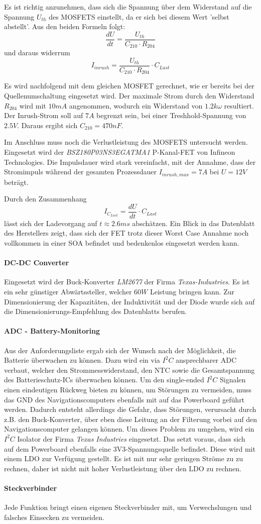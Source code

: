 \documentclass[main.tex]{subfiles} %
\begin{document}
Es ist richtig anzunehmen, dass sich die Spannung über dem Widerstand auf die
Spannung $U_{th}$ des MOSFETS einstellt, da er sich bei diesem Wert 'selbst
abstellt'. Aus den beiden Formeln folgt:
\[
    \frac{dU}{dt} = \frac{U_{th}}{C_{210} \cdot R_{204}}
\]
und daraus widerrum
\[
    I_{inrush} = \frac{U_{th}}{C_{210} \cdot R_{204}} \cdot C_{Last}
\]

Es wird nachfolgend mit dem gleichen MOSFET gerechnet, wie er bereits bei der
Quellenumschaltung eingesetzt wird. Der maximale Strom durch den Widerstand
$R_{204}$ wird mit $10mA$ angenommen, wodurch ein Widerstand von $1.2k \omega$
resultiert. Der Inrush-Strom soll auf $7A$ begrenzt sein, bei einer
Treshhold-Spannung von $2.5V$. Daraus ergibt sich $C_{210} = 470nF$.

Im Anschluss muss noch die Verlustleistung des MOSFETS untersucht werden.
Eingesetzt wird der \textit{BSZ180P03NS3EGATMA1} P-Kanal-FET von Infineon
Technologies. Die Impulsdauer wird stark vereinfacht, mit der Annahme, dass der
Stromimpuls während der gesamten Prozessdauer $I_{inrush, max} = 7A$ bei $U =
    12V$ beträgt.

Durch den Zusammenhang
\[
    I_{C_{Last}}  = \frac{dU}{dt} \cdot C_{Last}
\]
lässt sich der Ladevorgang auf $t \approx 2.6ms$ abschätzen. Ein Blick in das
Datenblatt des Herstellers zeigt, dass sich der FET trotz dieser Worst Case
Annahme noch vollkommen in einer SOA befindet und bedenkenlos eingesetzt werden
kann.

\paragraph{DC-DC Converter}
Eingesetzt wird der Buck-Konverter \textit{LM2677} der Firma
\textit{Texas-Industries}. Es ist ein sehr günstiger Abwärtssteller, welcher
$60W$ Leistung bringen kann. Zur Dimensionierung der Kapazitäten, der
Induktivität und der Diode wurde sich auf die Dimensionierungs-Empfehlung des
Datenblatts berufen.

\paragraph{ADC - Battery-Monitoring}
Aus der Anforderungsliste ergab sich der Wunsch nach der Möglichkeit, die
Batterie überwachen zu können. Dazu wird ein via $I^2C$ ansprechbarer ADC
verbaut, welcher den Strommesswiderstand, den NTC sowie die Gesamtspannung des
Batterieschutz-ICs überwachen können. Um den single-ended $I^2C$ Signalen einen
eindeutigen Rückweg bieten zu können, um Störungen zu vermeiden, muss das GND
des Navigationscomputers ebenfalls mit auf das Powerboard geführt werden.
Dadurch entsteht allerdings die Gefahr, dass Störungen, verursacht durch z.B.
den Buck-Konverter, über eben diese Leitung an der Filterung vorbei auf den
Navigationscomputer gelangen können. Um dieses Problem zu umgehen, wird ein
$I^2C$ Isolator der Firma \textit{Texas Industries} eingesetzt. Das setzt
voraus, dass sich auf dem Powerboard ebenfalls eine 3V3-Spannungsquelle
befindet. Diese wird mit einem LDO zur Verfügung gestellt. Es ist mit nur sehr
geringen Ströme zu zu rechnen, daher ist nicht mit hoher Verlustleistung über
den LDO zu rechnen.

\paragraph{Steckverbinder}
Jede Funktion bringt einen eigenen Steckverbinder mit, um Verwechslungen und
falsches Einsecken zu vermeiden.
\end{document}
